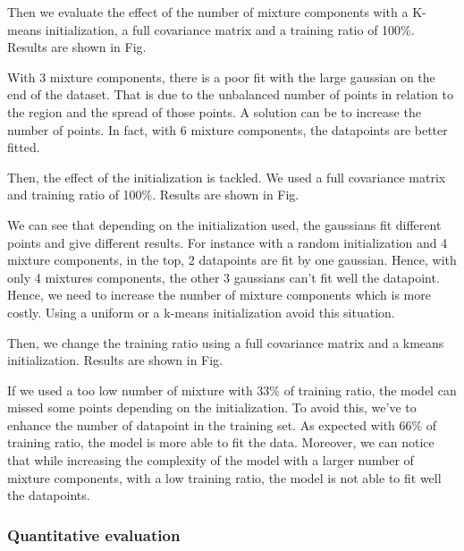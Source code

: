 Then we evaluate the effect of the number of mixture components with a K-means initialization, a full covariance matrix and a training ratio of 100\%. Results are shown in Fig. 
 

With 3 mixture components, there is a poor fit with the large gaussian on the end of the dataset. That is due to the unbalanced number of points in relation to the region and the spread of those points. A solution can be to increase the number of points. In fact, with 6 mixture components, the datapoints are better fitted.

Then, the effect of the initialization is tackled. We used a full covariance matrix and training ratio of 100\%. Results are shown in Fig.


We can see that depending on the initialization used, the gaussians fit different points and give different results. For instance with a random initialization and 4 mixture components, in the top, 2 datapoints are fit by one gaussian. Hence, with only 4 mixtures components, the other 3 gaussians can't fit well the datapoint. Hence, we need to increase the number of mixture components which is more costly. Using a uniform or a k-means initialization avoid this situation. 

Then, we change the training ratio using a full covariance matrix and a kmeans initialization. Results are shown in Fig.


If we used a too low number of mixture with 33\% of training ratio, the model can missed some points depending on the initialization. To avoid this, we've to enhance the number of datapoint in the training set. As expected with 66\% of training ratio, the model is more able to fit the data. Moreover, we can notice that while increasing the complexity of the model with a larger number of mixture components, with a low training ratio, the model is not able to fit well the datapoints.

\subsubsection{Quantitative evaluation}

